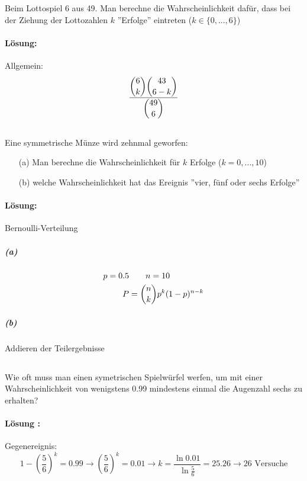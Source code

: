 \documentclass[ngerman]{scrartcl}
\begin{document}
\subsection{}
Beim Lottospiel 6 aus 49. Man berechne die Wahrscheinlichkeit dafür, dass bei der Ziehung der Lottozahlen $k$ ''Erfolge''  eintreten ($k \in \lbrace0,...,6\rbrace$)
\paragraph{Lösung:}
Allgemein:
\begin{equation}
\frac{\dbinom{6}{k}\dbinom{43}{6-k}}{\dbinom{49}{6}}
\end{equation}

\subsection{}
Eine symmetrische Münze wird zehnmal geworfen:
\begin{enumerate}
\item[(a)] Man berechne die Wahrscheinlichkeit für $k$ Erfolge ($k = 0,...,10$)
\item[(b)] welche Wahrscheinlichkeit hat das Ereignis ''vier, fünf oder sechs Erfolge''
\end{enumerate}
\paragraph{Lösung:}
Bernoulli-Verteilung
\subparagraph{(a)}
\begin{align}
p = 0.5 &\qquad n = 10\\
P &=  \dbinom{n}{k} p^{k} (1-p)^{n-k}
\end{align}
\subparagraph{(b)} Addieren der Teilergebnisse
\subsection{}
Wie oft muss man einen symetrischen Spielwürfel werfen, um mit einer Wahrscheinlichkeit von wenigstens 0.99 mindestens einmal die Augenzahl sechs zu erhalten?
\paragraph{Lösung :}
Gegenereignis:
\begin{equation}
1- \left(\frac{5}{6}\right)^{k} = 0.99 \rightarrow \left(\frac{5}{6}\right)^{k} = 0.01 
\rightarrow k = \frac{\ln 0.01}{\ln \frac{5}{6}} = 25.26 \rightarrow 26 \text{ Versuche}
\end{equation}
\end{document}
